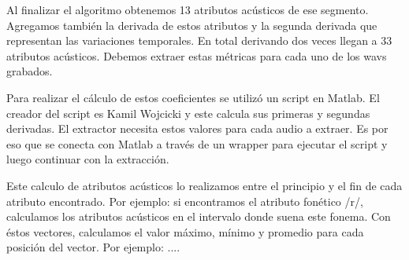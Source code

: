 Al finalizar el algoritmo obtenemos 13 atributos acústicos de ese segmento. Agregamos también la derivada de estos atributos y la segunda derivada que representan las variaciones temporales. En total derivando dos veces llegan a 33 atributos acústicos. Debemos extraer estas métricas para cada uno de los wavs grabados.

Para realizar el cálculo de estos coeficientes se utilizó un script en Matlab. El creador del script es Kamil Wojcicki y este calcula  sus primeras y segundas derivadas. El extractor necesita estos valores para cada audio a extraer. Es por eso que se conecta con Matlab a través de un wrapper para ejecutar el script y luego continuar con la extracción.

Este calculo de atributos acústicos lo realizamos entre el principio y el fin de cada atributo encontrado. Por ejemplo: si encontramos el atributo fonético /r/, calculamos los atributos acústicos en el intervalo donde suena este fonema. Con éstos vectores, calculamos el valor máximo, mínimo y promedio para cada posición del vector. Por ejemplo: ....

